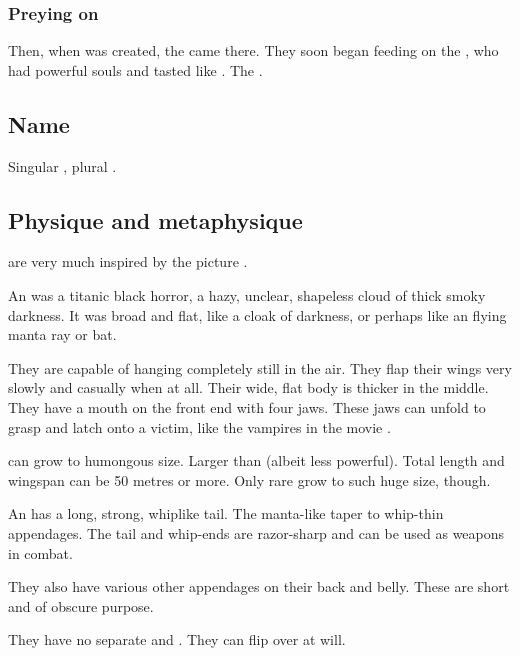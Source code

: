 \subsubsection{Preying on \resphain}
Then, when \Nyx{} was created, the \umbrae{} came there. 
They soon began feeding on the \resphain, who had powerful souls and tasted like \banes. 
The . 









\subsection{Name}
Singular \emph{\umbra{}}, plural \emph{\umbrae{}}. 









\subsection{Physique and metaphysique}
\Umbrae are very much inspired by the picture \cite{Picture:GunnerRomantic:BermudaTaowls}. 

An \umbra was a titanic black horror, a hazy, unclear, shapeless cloud of thick smoky darkness. 
It was broad and flat, like a cloak of darkness, or perhaps like an flying manta ray or bat. 

They are capable of hanging completely still in the air.
They flap their wings very slowly and casually when at all. 
Their wide, flat body is thicker in the middle. 
They have a mouth on the front end with four jaws. 
These jaws can unfold to grasp and latch onto a victim, like the vampires in the movie \cite{Movie:BladeII}. 

\Umbrae can grow to humongous size.
Larger than \dragons (albeit less powerful). 
Total length and wingspan can be 50 metres or more. 
Only rare \umbrae grow to such huge size, though. 

An \umbra{} has a long, strong, whiplike tail. 
The manta-like taper to whip-thin appendages. 
The tail and whip-ends are razor-sharp and can be used as weapons in combat. 

They also have various other appendages on their back and belly. 
These are short and of obscure purpose. 

They have no separate  and . 
They can flip over at will. 

